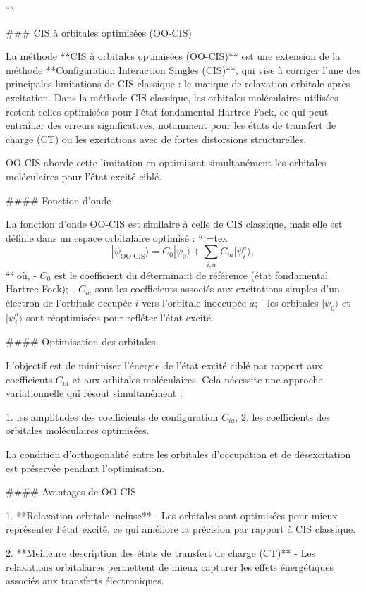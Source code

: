\documentclass[12pt,a4paper]{report}
\begin{document}
\begin{markdown}
```

### CIS à orbitales optimisées (OO-CIS)

La méthode **CIS à orbitales optimisées (OO-CIS)** est une extension de la méthode **Configuration Interaction Singles (CIS)**, qui vise à corriger l'une des principales limitations de CIS classique : le manque de relaxation orbitale après excitation. Dans la méthode CIS classique, les orbitales moléculaires utilisées restent celles optimisées pour l'état fondamental Hartree-Fock, ce qui peut entraîner des erreurs significatives, notamment pour les états de transfert de charge (CT) ou les excitations avec de fortes distorsions structurelles.

OO-CIS aborde cette limitation en optimisant simultanément les orbitales moléculaires pour l’état excité ciblé.

#### Fonction d'onde

La fonction d'onde OO-CIS est similaire à celle de CIS classique, mais elle est définie dans un espace orbitalaire optimisé :
```{=tex}
\[
|\psi_{\text{OO-CIS}}\rangle = C_0 |\psi_0\rangle + \sum_{i,a} C_{ia} |\psi_i^a\rangle ,
\]
```
où,
- \(C_0\) est le coefficient du déterminant de référence (état fondamental Hartree-Fock);
- \(C_{ia}\) sont les coefficients associés aux excitations simples d'un électron de l'orbitale occupée \(i\) vers l'orbitale inoccupée \(a\);
- les orbitales \(|\psi_0\rangle\) et \(|\psi_i^a\rangle\) sont réoptimisées pour refléter l'état excité.

#### Optimisation des orbitales

L’objectif est de minimiser l'énergie de l'état excité ciblé par rapport aux coefficients \(C_{ia}\) et aux orbitales moléculaires. Cela nécessite une approche variationnelle qui résout simultanément :

1. les amplitudes des coefficients de configuration \(C_{ia}\),
2. les coefficients des orbitales moléculaires optimisées.

La condition d’orthogonalité entre les orbitales d’occupation et de désexcitation est préservée pendant l’optimisation.

#### Avantages de OO-CIS

1. **Relaxation orbitale incluse**
   - Les orbitales sont optimisées pour mieux représenter l'état excité, ce qui améliore la précision par rapport à CIS classique.

2. **Meilleure description des états de transfert de charge (CT)**
   - Les relaxations orbitalaires permettent de mieux capturer les effets énergétiques associés aux transferts électroniques.


\end{markdown}
\end{document}
